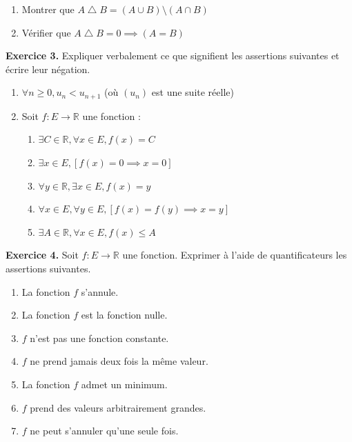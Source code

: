 \documentclass[a4paper, 10pt]{report}
\begin{document}
	\begin{enumerate}[label=(\roman*)]
		\item Montrer que $A \bigtriangleup B =
			(A \cup B) \setminus (A \cap B)$
		\item Vérifier que $A \bigtriangleup B = 0 \implies (A = B)$
	\end{enumerate}
	
	\vspace{5mm}
	\noindent
	\textbf{Exercice 3.} Expliquer verbalement ce que signifient les
	assertions suivantes et écrire leur négation.
	
	\begin{enumerate}[label=(\roman*)]
		\item $\forall n \geq 0, u_n < u_{n+1}$
		(où $(u_n)$ est une suite réelle)
		\item Soit $f : E \to \mathbb{R}$ une fonction :
		\begin{enumerate}[label=(\alph*)]
			\item $\exists C \in \mathbb{R},
				\forall x \in E,
				f(x) = C$
			\item $\exists x \in E,
				[f(x) = 0 \implies x = 0]$
			\item $\forall y \in \mathbb{R},
				\exists x \in E,
				f(x) = y$
			\item $\forall x \in E,
				\forall y \in E,
				[f(x) = f(y) \implies x = y]$
			\item $\exists A \in \mathbb{R},
				\forall x \in E,
				f(x) \leq A$
		\end{enumerate}
	\end{enumerate}
	
	\vspace{5mm}
	\noindent
	\textbf{Exercice 4.} Soit $f : E \to \mathbb{R}$ une fonction.
	Exprimer à l'aide de quantificateurs les assertions suivantes.
	
	\begin{enumerate}[label=(\roman*)]
		\item La fonction $f$ s'annule.
		\item La fonction $f$ est la fonction nulle.
		\item $f$ n'est pas une fonction constante.
		\item $f$ ne prend jamais deux fois la même valeur.
		\item La fonction $f$ admet un minimum.
		\item $f$ prend des valeurs arbitrairement grandes.
		\item $f$ ne peut s'annuler qu'une seule fois.
	\end{enumerate}
	
\end{document}
